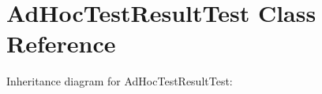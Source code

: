 \hypertarget{classAdHocTestResultTest}{}\section{Ad\+Hoc\+Test\+Result\+Test Class Reference}
\label{classAdHocTestResultTest}


Inheritance diagram for Ad\+Hoc\+Test\+Result\+Test\+:
